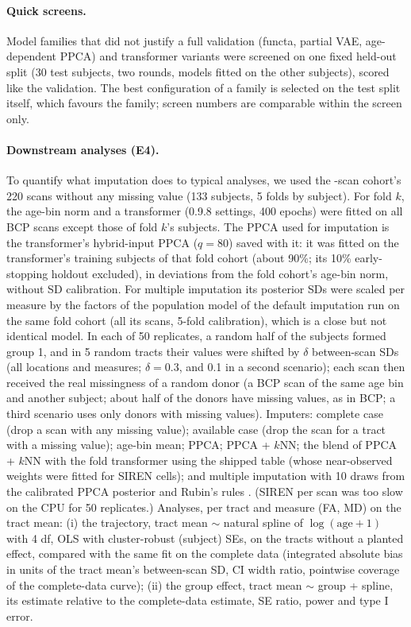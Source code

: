 \documentclass[11pt]{article}
\begin{document}
\paragraph{Quick screens.} Model families that did not justify a full validation (functa, partial VAE, age-dependent
PPCA) and transformer variants were screened on one fixed held-out split (30 test subjects, two rounds, models fitted
on the other subjects), scored like the validation. The best configuration of a family is selected on the test split
itself, which favours the family; screen numbers are comparable within the screen only.

\paragraph{Downstream analyses (E4).} To quantify what imputation does to typical analyses, we used the
\bcpscans{}-scan cohort's 220 scans without any missing value (133 subjects, 5 folds by subject). For fold $k$, the age-bin
norm and a transformer (0.9.8 settings, 400 epochs) were fitted on all BCP scans except those of fold $k$'s subjects. The
PPCA used for imputation is the transformer's hybrid-input PPCA ($q=80$) saved with it: it was fitted on the transformer's
training subjects of that fold cohort (about 90\%; its 10\% early-stopping holdout excluded), in deviations from the fold
cohort's age-bin norm, without SD calibration. For multiple imputation its posterior SDs were scaled per measure by the
factors of the population model of the default imputation run on the same fold cohort (all its scans, 5-fold
calibration), which is a close but not identical model.
In each of 50 replicates, a random half of the subjects formed group 1, and in 5 random tracts their values were shifted
by $\delta$ between-scan SDs (all locations and measures; $\delta=0.3$, and 0.1 in a second scenario); each scan then
received the real missingness of a random donor (a BCP scan of the same age bin and another subject; about half of the
donors have missing values, as in BCP; a third scenario uses only donors with missing values). Imputers: complete case
(drop a scan with any missing value); available case (drop the scan for a tract with a missing value); age-bin mean;
PPCA; PPCA + $k$NN; the blend of PPCA + $k$NN with the fold transformer using the shipped table (whose near-observed
weights were fitted for SIREN cells); and multiple imputation with 10 draws from the calibrated PPCA posterior and
Rubin's rules \citep{rubin1987multiple}. (SIREN per scan was too slow on the CPU for 50 replicates.) Analyses, per tract
and measure (FA, MD) on the tract mean: (i) the trajectory, tract mean $\sim$ natural spline of $\log(\text{age}+1)$ with
4 df, OLS with cluster-robust (subject) SEs, on the tracts without a planted effect, compared with the same fit on the
complete data (integrated absolute bias in units of the tract mean's between-scan SD, CI width ratio, pointwise coverage
of the complete-data curve); (ii) the group effect, tract mean $\sim$ group + spline, its estimate relative to the
complete-data estimate, SE ratio, power and type I error.
\end{document}
